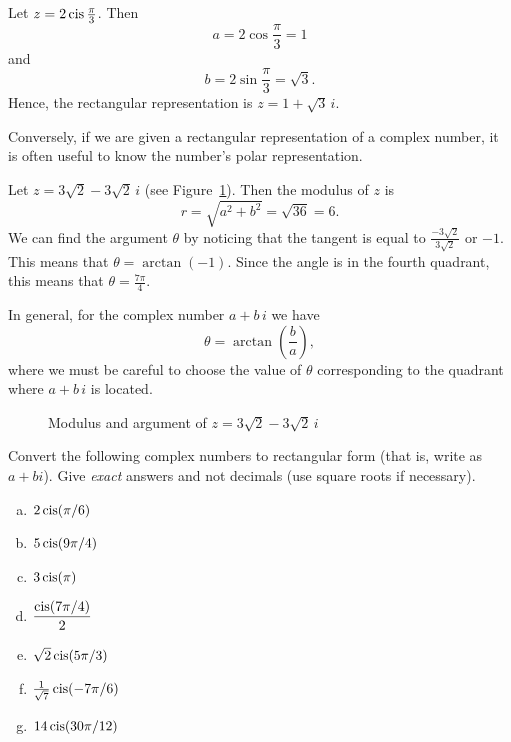{\begin{example}{1} Let $z=2\operatorname{cis} \frac{\pi}{3}$. Then
\[
a=2\cos \frac{\pi}{3}=1\]
 and \[
b=2\sin \frac{\pi}{3}=\sqrt{3}.\]
 Hence, the rectangular representation is $z=1+\sqrt{3}\, i$.
\end{example}
Conversely, if we are given a rectangular representation of a complex
number, it is often useful to know the number's polar representation.

\begin{example}{2} Let $z=3\sqrt{2}-3\sqrt{2}\, i$ (see Figure~\ref{fig:complex:polar_to_cart}). Then the modulus of $z$ is 
\[
r=\sqrt{a^{2}+b^{2}}=\sqrt{36}=6.\]
 We can find the argument $\theta$ by noticing that the tangent is equal to $\frac{-3\sqrt{2}}{3\sqrt{2}}$ or $-1$. This means that
 $\theta = \arctan(-1)$.
 Since the angle is in the fourth quadrant, this means that $\theta = \frac{7\pi}{4}$. 
 
 In general, for the complex number $a + b\,i$ we have
 \[\theta=\arctan\left(\frac{b}{a}\right),\]
where we must be careful to choose the value of $\theta$ corresponding to the quadrant where $a + b\,i$ is located. 
 \end{example} 
\begin{figure}[htb]
	  \caption{\label{fig:complex:polar_to_cart} Modulus and argument of  $z=3\sqrt{2}-3\sqrt{2}\, i$}
\end{figure}

\begin{exercise}{21}
Convert the following complex numbers to rectangular form (that is, write as $a + bi$). Give \emph{exact} answers and not decimals (use square roots if necessary).
\begin{multicols}{2}
\begin{enumerate}[(a)]

\item
$2 \operatorname{cis}(\pi / 6 )$
\item
$5 \operatorname{cis}(9\pi/4)$
\item
$3 \operatorname{cis}(\pi)$
 \item
$\dfrac{\operatorname{cis}(7\pi/4)}{2}$
\item
$\sqrt{2} \operatorname{cis}(5\pi / 3 )$
\item
$\frac{1}{\sqrt{7}} \operatorname{cis}(-7\pi / 6 )$
\item
$14 \operatorname{cis}(30 \pi / 12 )$


\end{enumerate}
\end{multicols}
\end{exercise}}
